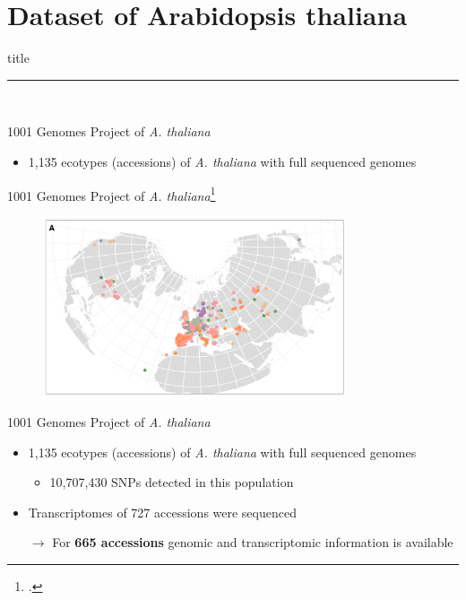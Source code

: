 \documentclass{beamer}
\begin{document}
\section{Dataset of Arabidopsis thaliana}
\begin{frame}[plain]
    \vfill
    \centering
    \begin{beamercolorbox}[sep=8pt,center,shadow=true,rounded=true]{title}
      \insertsectionhead\par%
      \noindent\rule{10cm}{1pt} \\
    \end{beamercolorbox}
    \vfill
\end{frame}
\begin{frame}{1001 Genomes Project of \textit{A. thaliana}}
	\begin{itemize}
		\item 1,135 ecotypes (accessions) of \textit{A. thaliana} with full sequenced genomes 
	\end{itemize}
\end{frame}
\begin{frame}{1001 Genomes Project of \textit{A. thaliana}\footcite{1001Genomes2016}}
	\begin{figure}[tb]
		\centering
		\begin{minipage}[h]{1\textwidth}
		\centering
		\includegraphics[width=0.8\textwidth]{images/Origins_1001_Genomes.png}
		\label{fig:Origins_1135}
		\end{minipage}
	\end{figure}
\end{frame}
\begin{frame}{1001 Genomes Project of \textit{A. thaliana}}
	\begin{itemize}
		\item 1,135 ecotypes (accessions) of \textit{A. thaliana} with full sequenced genomes 
		\begin{itemize}
			\item 10,707,430 SNPs detected in this population
		\end{itemize}
		\item Transcriptomes of 727 accessions were sequenced 
		\item[$\rightarrow$] For \textbf{665 accessions} genomic and transcriptomic information is available 
	\end{itemize}
\end{frame}
\end{document}

